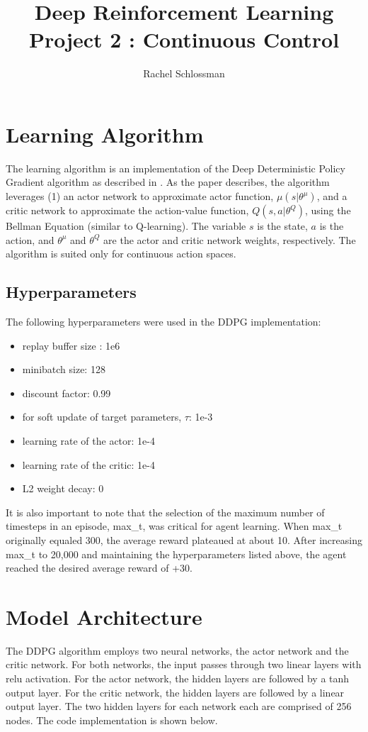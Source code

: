 \documentclass{article}
\begin{document}
\title{Deep Reinforcement Learning Project 2 : Continuous Control}
\author{Rachel Schlossman}

\maketitle

\section{Learning Algorithm}
The learning algorithm is an implementation of the Deep Deterministic Policy Gradient algorithm as described in \cite{lillicrap2015continuous}. As the paper describes, the algorithm leverages (1) an actor network to approximate actor function, $\mu(s|\theta^{\mu})$, and a critic network to approximate the action-value function, $Q(s,a|\theta^Q)$, using the Bellman Equation (similar to Q-learning). The variable $s$ is the state, $a$ is the action, and $\theta^{\mu}$ and $\theta^{Q}$ are the actor and critic network weights, respectively.  The algorithm is suited only for continuous action spaces.

\subsection{Hyperparameters}
The following hyperparameters were used in the DDPG implementation:

\begin{itemize}
\item replay buffer size : 1e6
\item minibatch size: 128
\item discount factor: 0.99 
\item for soft update of target parameters, $\tau$: 1e-3
\item learning rate of the actor: 1e-4  
\item learning rate of the critic: 1e-4 
\item L2 weight decay: 0
\end{itemize}

It is also important to note that the selection of the maximum number of timesteps in an episode, max\_t, was critical for agent learning. When max\_t originally equaled 300, the average reward plateaued at about 10. After increasing max\_t to 20,000 and maintaining the hyperparameters listed above, the agent reached the desired average reward of +30.

\section{Model Architecture}
The DDPG algorithm employs two neural networks, the actor network and the critic network. For both networks, the input passes through two linear layers with relu activation. For the actor network, the hidden layers are followed by a tanh output layer. For the critic network, the hidden layers are followed by a linear output layer. The two hidden layers for each network each are comprised of 256 nodes. The code implementation is shown below. 
\end{document}

